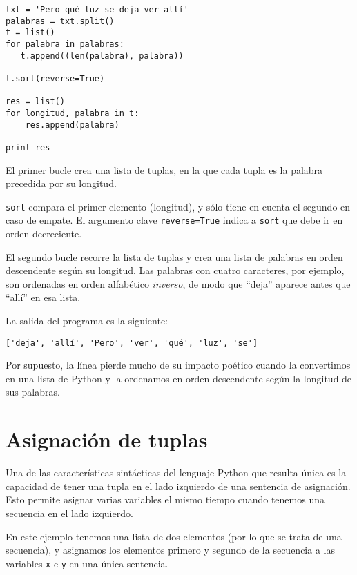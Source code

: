 \beforeverb
\begin{verbatim}
txt = 'Pero qué luz se deja ver allí'
palabras = txt.split()
t = list()
for palabra in palabras:
   t.append((len(palabra), palabra))

t.sort(reverse=True)

res = list()
for longitud, palabra in t:
    res.append(palabra)

print res
\end{verbatim}
\afterverb
%
El primer bucle crea una lista de tuplas, en la que cada
tupla es la palabra precedida por su longitud.

{\tt sort} compara el primer elemento (longitud), y
sólo tiene en cuenta el segundo en caso de empate. El argumento
clave {\tt reverse=True} indica a {\tt sort} que debe ir en orden decreciente.


El segundo bucle recorre la lista de tuplas y crea una lista de
palabras en orden descendente según su longitud. Las palabras con cuatro caracteres,
por ejemplo, son ordenadas en orden alfabético {\em inverso}, de modo que
``deja'' aparece antes que ``allí'' en esa lista.

La salida del programa es la siguiente:
%
\beforeverb
\begin{verbatim}
['deja', 'allí', 'Pero', 'ver', 'qué', 'luz', 'se']
\end{verbatim}
\afterverb
%
Por supuesto, la línea pierde mucho de su impacto poético
cuando la convertimos en una lista de Python y la ordenamos
en orden descendente según la longitud de sus palabras.

\section{Asignación de tuplas}
\label{tuple assignment}


Una de las características sintácticas del lenguaje Python que resulta única
es la capacidad de tener una tupla en el lado
izquierdo de una sentencia de asignación. Esto permite asignar
varias variables el mismo tiempo cuando tenemos una secuencia
en el lado izquierdo.

En este ejemplo tenemos una lista de dos elementos (por lo que se trata de una secuencia), y
asignamos los elementos primero y segundo de la secuencia
a las variables {\tt x} e {\tt y} en una única sentencia.

